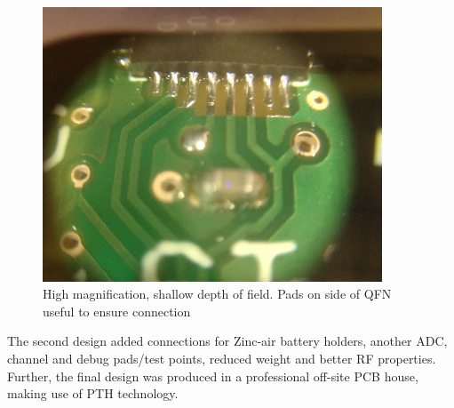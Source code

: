 \documentclass[]{article}
\begin{document}
\begin{figure}[htb]
	\begin{center}
		\includegraphics[width = 0.9\textwidth]{side}
	\end{center}
	\caption{High magnification, shallow depth of field. Pads on side of \ac{QFN} useful to ensure connection}
	\label{fig:side}
\end{figure} 

The second design added connections for Zinc-air battery holders, another \ac{ADC}, channel and debug pads/test points, reduced weight and better RF properties. Further, the final design was produced in a professional off-site \ac{PCB} house, making use of \ac{PTH} technology.
\end{document}
